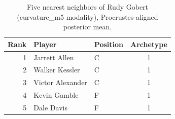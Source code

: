 \begin{table}[htbp]
  \centering\small
  \begin{tabular}{rllc}
    \toprule
    Rank & Player & Position & Archetype \\
    \midrule
    1 & Jarrett Allen & C & 1 \\
    2 & Walker Kessler & C & 1 \\
    3 & Victor Alexander & C & 1 \\
    4 & Kevin Gamble & F & 1 \\
    5 & Dale Davis & F & 1 \\
    \bottomrule
  \end{tabular}
  \caption{Five nearest neighbors of Rudy Gobert (curvature_m5 modality), Procrustes-aligned posterior mean.}
  \label{tab:Rudy_Gobert_neighbors_curvature_m5}
\end{table}

